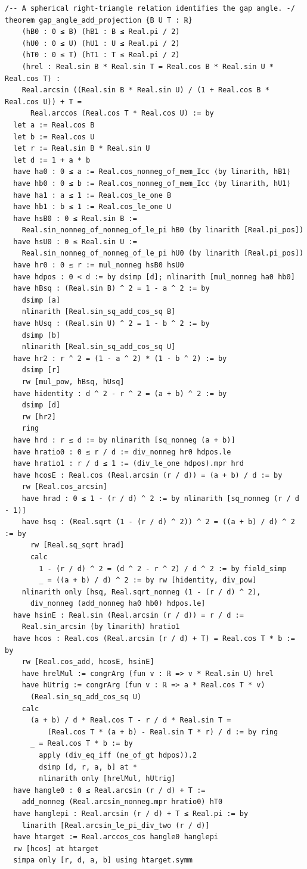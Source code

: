 \documentclass[11pt,a4paper]{article}
\begin{document}
\begin{Verbatim}[breaklines,breakanywhere,fontsize=\footnotesize]
/-- A spherical right-triangle relation identifies the gap angle. -/
theorem gap_angle_add_projection {B U T : ℝ}
    (hB0 : 0 ≤ B) (hB1 : B ≤ Real.pi / 2)
    (hU0 : 0 ≤ U) (hU1 : U ≤ Real.pi / 2)
    (hT0 : 0 ≤ T) (hT1 : T ≤ Real.pi / 2)
    (hrel : Real.sin B * Real.sin T = Real.cos B * Real.sin U * Real.cos T) :
    Real.arcsin ((Real.sin B * Real.sin U) / (1 + Real.cos B * Real.cos U)) + T =
      Real.arccos (Real.cos T * Real.cos U) := by
  let a := Real.cos B
  let b := Real.cos U
  let r := Real.sin B * Real.sin U
  let d := 1 + a * b
  have ha0 : 0 ≤ a := Real.cos_nonneg_of_mem_Icc ⟨by linarith, hB1⟩
  have hb0 : 0 ≤ b := Real.cos_nonneg_of_mem_Icc ⟨by linarith, hU1⟩
  have ha1 : a ≤ 1 := Real.cos_le_one B
  have hb1 : b ≤ 1 := Real.cos_le_one U
  have hsB0 : 0 ≤ Real.sin B :=
    Real.sin_nonneg_of_nonneg_of_le_pi hB0 (by linarith [Real.pi_pos])
  have hsU0 : 0 ≤ Real.sin U :=
    Real.sin_nonneg_of_nonneg_of_le_pi hU0 (by linarith [Real.pi_pos])
  have hr0 : 0 ≤ r := mul_nonneg hsB0 hsU0
  have hdpos : 0 < d := by dsimp [d]; nlinarith [mul_nonneg ha0 hb0]
  have hBsq : (Real.sin B) ^ 2 = 1 - a ^ 2 := by
    dsimp [a]
    nlinarith [Real.sin_sq_add_cos_sq B]
  have hUsq : (Real.sin U) ^ 2 = 1 - b ^ 2 := by
    dsimp [b]
    nlinarith [Real.sin_sq_add_cos_sq U]
  have hr2 : r ^ 2 = (1 - a ^ 2) * (1 - b ^ 2) := by
    dsimp [r]
    rw [mul_pow, hBsq, hUsq]
  have hidentity : d ^ 2 - r ^ 2 = (a + b) ^ 2 := by
    dsimp [d]
    rw [hr2]
    ring
  have hrd : r ≤ d := by nlinarith [sq_nonneg (a + b)]
  have hratio0 : 0 ≤ r / d := div_nonneg hr0 hdpos.le
  have hratio1 : r / d ≤ 1 := (div_le_one hdpos).mpr hrd
  have hcosE : Real.cos (Real.arcsin (r / d)) = (a + b) / d := by
    rw [Real.cos_arcsin]
    have hrad : 0 ≤ 1 - (r / d) ^ 2 := by nlinarith [sq_nonneg (r / d - 1)]
    have hsq : (Real.sqrt (1 - (r / d) ^ 2)) ^ 2 = ((a + b) / d) ^ 2 := by
      rw [Real.sq_sqrt hrad]
      calc
        1 - (r / d) ^ 2 = (d ^ 2 - r ^ 2) / d ^ 2 := by field_simp
        _ = ((a + b) / d) ^ 2 := by rw [hidentity, div_pow]
    nlinarith only [hsq, Real.sqrt_nonneg (1 - (r / d) ^ 2),
      div_nonneg (add_nonneg ha0 hb0) hdpos.le]
  have hsinE : Real.sin (Real.arcsin (r / d)) = r / d :=
    Real.sin_arcsin (by linarith) hratio1
  have hcos : Real.cos (Real.arcsin (r / d) + T) = Real.cos T * b := by
    rw [Real.cos_add, hcosE, hsinE]
    have hrelMul := congrArg (fun v : ℝ => v * Real.sin U) hrel
    have hUtrig := congrArg (fun v : ℝ => a * Real.cos T * v)
      (Real.sin_sq_add_cos_sq U)
    calc
      (a + b) / d * Real.cos T - r / d * Real.sin T =
          (Real.cos T * (a + b) - Real.sin T * r) / d := by ring
      _ = Real.cos T * b := by
        apply (div_eq_iff (ne_of_gt hdpos)).2
        dsimp [d, r, a, b] at *
        nlinarith only [hrelMul, hUtrig]
  have hangle0 : 0 ≤ Real.arcsin (r / d) + T :=
    add_nonneg (Real.arcsin_nonneg.mpr hratio0) hT0
  have hanglepi : Real.arcsin (r / d) + T ≤ Real.pi := by
    linarith [Real.arcsin_le_pi_div_two (r / d)]
  have htarget := Real.arccos_cos hangle0 hanglepi
  rw [hcos] at htarget
  simpa only [r, d, a, b] using htarget.symm


\end{Verbatim}
\end{document}

